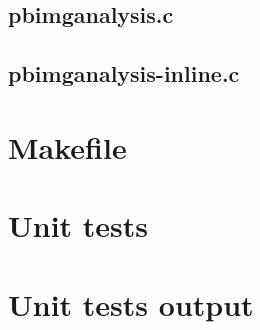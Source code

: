 \subsection{pbimganalysis.c}

\begin{scriptsize}
\begin{ttfamily}

\end{ttfamily}
\end{scriptsize}

\subsection{pbimganalysis-inline.c}

\begin{scriptsize}
\begin{ttfamily}

\end{ttfamily}
\end{scriptsize}

\section{Makefile}

\begin{scriptsize}
\begin{ttfamily}

\end{ttfamily}
\end{scriptsize}

\section{Unit tests}

\begin{scriptsize}
\begin{ttfamily}

\end{ttfamily}
\end{scriptsize}

\section{Unit tests output}

\begin{scriptsize}
\begin{ttfamily}

\end{ttfamily}
\end{scriptsize}


